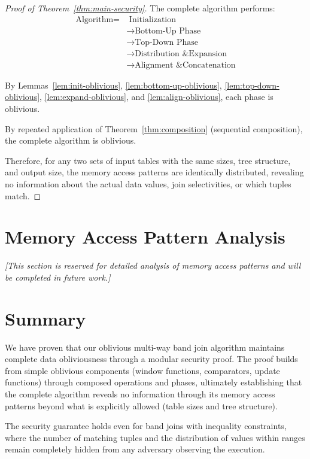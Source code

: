 \begin{proof}[Proof of Theorem~\ref{thm:main-security}]
The complete algorithm performs:
\begin{align}
\text{Algorithm} = &\text{ Initialization} \nonumber \\
&\rightarrow \text{Bottom-Up Phase} \nonumber \\
&\rightarrow \text{Top-Down Phase} \nonumber \\
&\rightarrow \text{Distribution \& Expansion} \nonumber \\
&\rightarrow \text{Alignment \& Concatenation} \nonumber
\end{align}

By Lemmas~\ref{lem:init-oblivious}, \ref{lem:bottom-up-oblivious}, \ref{lem:top-down-oblivious}, \ref{lem:expand-oblivious}, and \ref{lem:align-oblivious}, each phase is oblivious.

By repeated application of Theorem~\ref{thm:composition} (sequential composition), the complete algorithm is oblivious.

Therefore, for any two sets of input tables with the same sizes, tree structure, and output size, the memory access patterns are identically distributed, revealing no information about the actual data values, join selectivities, or which tuples match.\end{proof}

\section{Memory Access Pattern Analysis}

\textit{[This section is reserved for detailed analysis of memory access patterns and will be completed in future work.]}

\section{Summary}

We have proven that our oblivious multi-way band join algorithm maintains complete data obliviousness through a modular security proof. The proof builds from simple oblivious components (window functions, comparators, update functions) through composed operations and phases, ultimately establishing that the complete algorithm reveals no information through its memory access patterns beyond what is explicitly allowed (table sizes and tree structure).

The security guarantee holds even for band joins with inequality constraints, where the number of matching tuples and the distribution of values within ranges remain completely hidden from any adversary observing the execution.